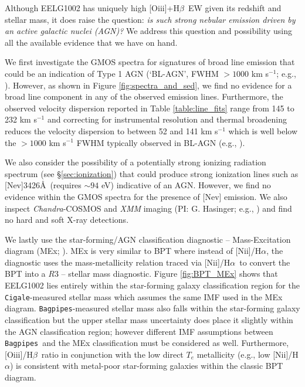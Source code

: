 \documentclass[twocolumn,tight,times,linenumbers]{aastex631}
\newcommand{\halpha}{H$\alpha$}
\newcommand{\hbeta}{H$\beta$}
\newcommand{\nii}{[N{\sc ii}]}
\newcommand{\oiii}{[O{\sc iii}]}
\newcommand{\cigale}{\texttt{Cigale}}
\newcommand{\bagpipes}{\texttt{Bagpipes}}
\begin{document}
		
		Although EELG1002 has uniquely high \oiii+\hbeta~EW given its redshift and stellar mass, it does raise the question: \textit{is such strong nebular emission driven by an active galactic nuclei (AGN)? }We address this question and possibility using all the available evidence that we have on hand.
		
		We first investigate the GMOS spectra for signatures of broad line emission that could be an indication of Type 1 AGN (`BL-AGN', FWHM $> 1000$ km s$^{-1}$; e.g., \citealt{Stirpe1990,Ho1997}). However, as shown in Figure \ref{fig:spectra_and_sed}, we find no evidence for a broad line component in any of the observed emission lines. Furthermore, the observed velocity dispersion reported in Table \ref{table:line_fits} range from 145 to 232 km s$^{-1}$ and correcting for instrumental resolution and thermal broadening reduces the velocity dispersion to between 52 and 141 km s$^{-1}$ which is well below the $> 1000$ km s$^{-1}$ FWHM typically observed in BL-AGN (e.g., \citealt{Genzel2014}).
		
		We also consider the possibility of a potentially strong ionizing radiation spectrum (see \S\ref{sec:ionization}) that could produce strong ionization lines such as [Ne{\sc v}]3426\AA~(requires $\sim 94$ eV) indicative of an AGN. However, we find no evidence within the GMOS spectra for the presence of [Ne{\sc v}] emission. We also inspect \textit{Chandra}-COSMOS \citep{Civano2016,Marchesi2016} and \textit{XMM} imaging (PI: G. Hasinger; e.g., \citealt{Hasinger2007}) and find no hard and soft X-ray detections.
		
		We lastly use the star-forming/AGN classification diagnostic -- Mass-Excitation diagram (MEx; \citealt{Juneau2011}). MEx is very similar to BPT \citep{BPT} where instead of \nii/\halpha, the diagnostic uses the mass-metallicity relation traced via \nii/\halpha~to convert the BPT into a $R3$ -- stellar mass diagnostic. Figure \ref{fig:BPT_MEx} shows that EELG1002 lies entirely within the star-forming galaxy classification region for the \cigale-measured stellar mass which assumes the same \citet{Chabrier2003} IMF used in the MEx diagram. \bagpipes-measured stellar mass also falls within the star-forming galaxy classification but the upper stellar mass uncertainty does place it slightly within the AGN classification region; however different IMF assumptions between \bagpipes~and the MEx classification must be considered as well. Furthermore, \oiii/\hbeta~ratio in conjunction with the low direct $T_e$ metallicity (e.g., low \nii/\halpha) is consistent with metal-poor star-forming galaxies within the classic BPT diagram.
			
\end{document}
